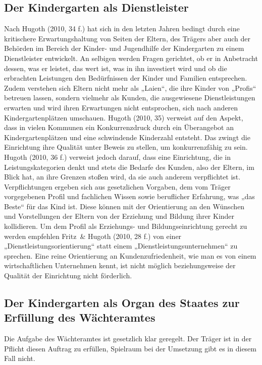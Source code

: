 \subsection{Der Kindergarten als Dienstleister}
Nach Hugoth (2010, 34 f.) hat sich in den letzten Jahren bedingt durch eine kritischere Erwartungshaltung von Seiten der Eltern, des Trägers aber auch der Behörden im Bereich der Kinder- und Jugendhilfe der Kindergarten zu einem Dienstleister entwickelt. An selbigen werden  Fragen gerichtet, ob er in Anbetracht dessen, was er leistet, das wert ist, was in ihn investiert wird und ob die erbrachten Leistungen den Bedürfnissen der Kinder und Familien entsprechen. Zudem verstehen sich Eltern nicht mehr als „Laien“, die ihre Kinder von „Profis“ betreuen lassen, sondern vielmehr als Kunden, die ausgewiesene Dienstleistungen erwarten und wird ihren Erwartungen nicht entsprochen, sich nach anderen Kindergartenplätzen umschauen. Hugoth (2010, 35) verweist auf den Aspekt, dass in vielen Kommunen ein Konkurrenzdruck durch ein Überangebot an Kindergartenplätzen und eine schwindende Kinderzahl entsteht. Das zwingt die Einrichtung ihre Qualität unter Beweis zu stellen, um konkurrenzfähig zu sein. 
Hugoth (2010, 36 f.) verweist jedoch darauf, dass eine Einrichtung, die in Leistungskategorien denkt und stets die Bedarfe des Kunden, also der Eltern, im Blick hat, an ihre Grenzen stoßen wird, da sie auch anderem verpflichtet ist. Verpflichtungen ergeben sich aus gesetzlichen Vorgaben, dem vom Träger vorgegebenen Profil und fachlichen Wissen sowie beruflicher Erfahrung, was „das Beste“ für das Kind ist. Diese können mit der Orientierung an den Wünschen und Vorstellungen der Eltern von der Erziehung und Bildung ihrer Kinder kollidieren. Um dem Profil als Erziehungs- und Bildungseinrichtung gerecht zu werden empfehlen Fritz~\& Hugoth (2010, 28 f.) von einer „Dienstleistungsorientierung“ statt einem „Dienstleistungsunternehmen“ zu sprechen. Eine reine Orientierung an Kundenzufriedenheit, wie man es von einem wirtschaftlichen Unternehmen kennt, ist nicht möglich beziehungsweise der Qualität der Einrichtung nicht förderlich. 

\subsection{Der Kindergarten als Organ des Staates zur Erfüllung des Wächteramtes}
Die Aufgabe des Wächteramtes ist gesetzlich klar geregelt. Der Träger ist in der Pflicht diesen Auftrag zu erfüllen, Spielraum bei der Umsetzung gibt es in diesem Fall nicht.
 
